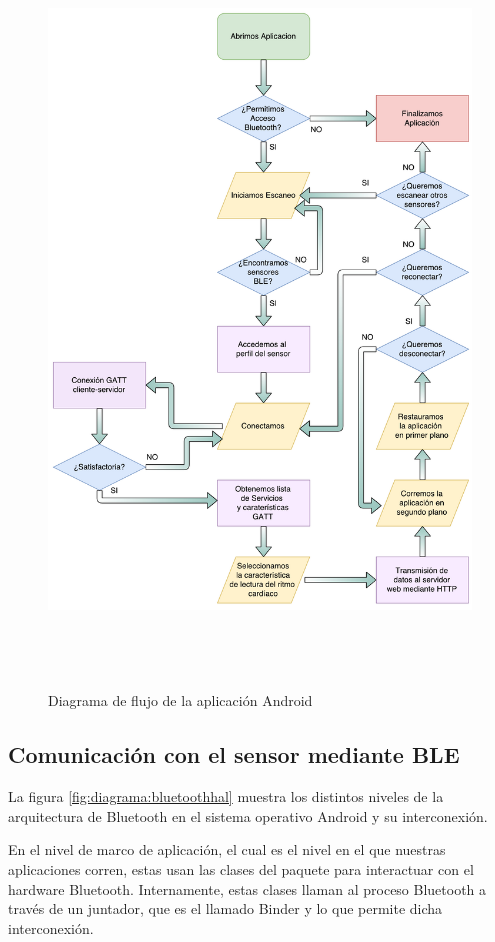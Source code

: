 	\begin{figure}[!htbp] \centering
		\includegraphics[height=20cm]{graphs/AndroidDiagramaFlujo.pdf} \caption{Diagrama de flujo de la aplicación Android}
		\label{DiagramaFlujo}
	\end{figure}
    
\subsection{Comunicación con el sensor mediante BLE}
	La figura \ref{fig:diagrama:bluetoothhal} muestra los distintos niveles de la arquitectura de Bluetooth en el sistema operativo Android y su interconexión.
	
	
	En el nivel de marco de aplicación, el cual es el nivel en el que nuestras aplicaciones corren, estas usan las clases del paquete  para interactuar con el hardware Bluetooth. Internamente, estas clases llaman al proceso Bluetooth a través de un juntador, que es el llamado Binder y lo que permite dicha interconexión.
	
